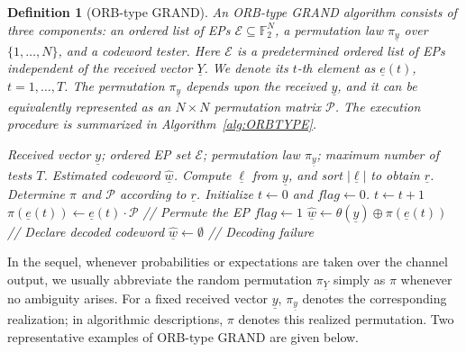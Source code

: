 \documentclass[letterpaper,draftclsnofoot,onecolumn]{IEEEtran}
\newtheorem{definition}{Definition}
\begin{document}
\begin{definition}[ORB-type GRAND]\label{def:orb_type}
    An ORB-type GRAND algorithm consists of three components: an ordered list of EPs $\mathcal{E} \subseteq \mathbb{F}_2^N$, a permutation law $\pi_{\underline{y}}$ over $\{1,\ldots, N\}$, and a codeword tester. Here $\mathcal{E}$ is a predetermined ordered list of EPs independent of the received vector $\underline Y$. We denote its $t$-th element as $\underline{e}(t)$, $t = 1, \ldots, T$. 
    The permutation $\pi_{\underline{y}}$ depends upon the received $\underline{y}$, and it can be equivalently represented as an $N \times N$ permutation matrix $\mathcal{P}$. The execution procedure is summarized in Algorithm~\ref{alg:ORBTYPE}.
    \begin{algorithm}[ht]
    \caption{ORB-type GRAND Algorithm}
    \label{alg:ORBTYPE}
    \begin{algorithmic}[1]
        \REQUIRE Received vector $\underline{y}$; ordered EP set $\mathcal{E}$; permutation law $\pi_{\underline{y}}$; maximum number of tests $T$.
        \ENSURE Estimated codeword $\hat{\underline{w}}$.
        \STATE Compute $\underline{\ell}$ from $\underline{y}$, and sort $|\underline{\ell}|$ to obtain $\underline{r}$.
        \STATE Determine $\pi$ and  $\mathcal{P}$ according to $\underline{r}$.
        \STATE Initialize $t \leftarrow 0$ and $\textit{flag} \leftarrow 0$.
            \STATE $t \leftarrow t + 1$
            \STATE $\pi(\underline{e}(t)) \leftarrow \underline{e}(t) \cdot \mathcal{P}$ \hfill // Permute the EP
                \STATE $\textit{flag} \leftarrow 1$
            \ENDIF
        \ENDWHILE
            \STATE $\hat{\underline{w}} \leftarrow \theta(\underline{y}) \oplus \pi(\underline{e}(t))$ \hfill // Declare decoded codeword
        \ELSE
            \STATE $\hat{\underline{w}} \leftarrow \emptyset$ \hfill // Decoding failure
        \ENDIF
    \end{algorithmic}
    \end{algorithm}
\end{definition}

In the sequel, whenever probabilities or expectations are taken over the channel output, we usually abbreviate the random permutation $\pi_{\underline{Y}}$ simply as $\pi$ whenever no ambiguity arises. For a fixed received vector $\underline{y}$, $\pi_{\underline{y}}$ denotes the corresponding realization; in algorithmic descriptions, $\pi$ denotes this realized permutation. Two representative examples of ORB-type GRAND are given below.
\end{document}
